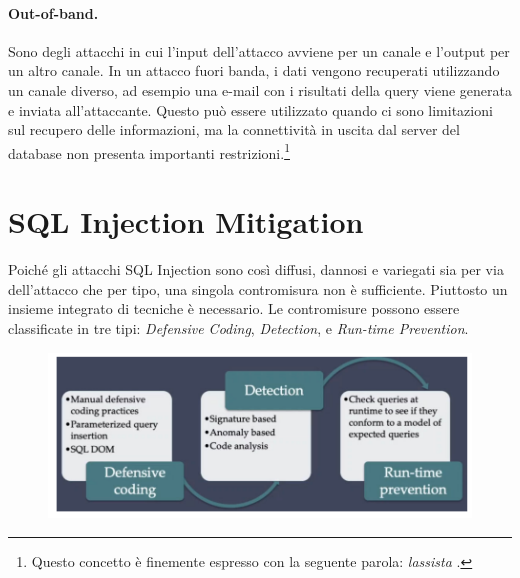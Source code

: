 \paragraph*{Out-of-band.}
Sono degli attacchi in cui l'input dell'attacco avviene per un canale e l'output
per un altro canale. In un attacco fuori banda, i dati vengono recuperati
utilizzando un canale diverso, ad esempio una e-mail con i risultati della query
viene generata e inviata all'attaccante. Questo può essere utilizzato quando ci
sono limitazioni sul recupero delle informazioni, ma la connettività in uscita
dal server del database non presenta importanti restrizioni.\footnote{Questo
      concetto è finemente espresso con la seguente parola: \textit{lassista}
      .}

\section{SQL Injection Mitigation}

Poiché gli attacchi SQL Injection sono così diffusi, dannosi e variegati sia per
via dell'attacco che per tipo, una singola contromisura non è sufficiente.
Piuttosto un insieme integrato di tecniche è necessario. Le contromisure possono
essere classificate in tre tipi: \textit{Defensive Coding}, \textit{Detection},
e \textit{Run-time Prevention}.

\begin{figure}[H]
      \centering
      \includegraphics[width=12cm, keepaspectratio]{capitoli/sql_security/imgs/sql2.png}
\end{figure}

